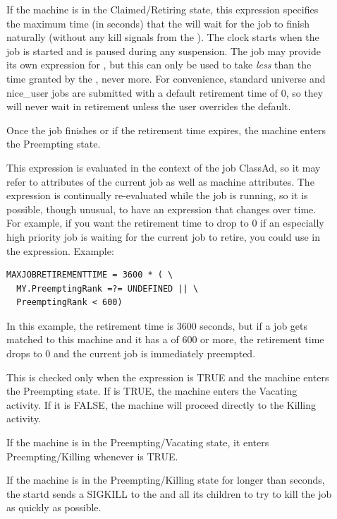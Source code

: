 \begin{description}
\item[] If the machine is in the
Claimed/Retiring state, this expression specifies the maximum time (in
seconds) that the  will wait for the job to finish naturally
(without any kill signals from the ).  The clock starts when the
job is started and is paused during any suspension.  The job may
provide its own expression for , but this
can only be used to take \emph{less} than the time granted by the
, never more.  For convenience, standard universe and
nice\_user jobs are submitted with a default retirement time of 0, so
they will never wait in retirement unless the user overrides the
default.

Once the job finishes or if the retirement time expires, the machine
enters the Preempting state.

This expression is evaluated in the context of the job ClassAd, so it
may refer to attributes of the current job as well as machine
attributes.  The expression is continually re-evaluated while the job
is running, so it is possible, though unusual, to have an expression
that changes over time.  For example, if you want the retirement time
to drop to 0 if an especially high priority job is waiting for the
current job to retire, you could use  in the
expression.  Example:

\begin{verbatim}
MAXJOBRETIREMENTTIME = 3600 * ( \
  MY.PreemptingRank =?= UNDEFINED || \
  PreemptingRank < 600)
\end{verbatim}

In this example, the retirement time is 3600 seconds, but if a job gets
matched to this machine and it has a  of 600 or more,
the retirement time drops to 0 and the current job is immediately preempted.

\item[\Macro{WANT\_VACATE}] This is checked only when the
   expression is TRUE and the machine enters the
  Preempting state.
  If \MacroNI{WANT\_VACATE} is TRUE, the machine enters the Vacating
  activity.  
  If it is FALSE, the machine will proceed directly to the Killing
  activity.  
  
\item[] If the machine is in the Preempting/Vacating state, it
  enters Preempting/Killing whenever  is TRUE. 
  
\item[\Macro{KILLING\_TIMEOUT}] If the machine is in the
  Preempting/Killing state for longer than 
  seconds, the startd sends a SIGKILL to the 
  and all its children to try to kill the job as quickly as possible.
  

\end{description}
